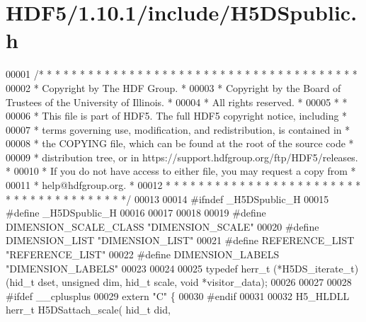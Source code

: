 \hypertarget{_h_d_f5_21_810_81_2include_2_h5_d_spublic_8h_source}{}\section{H\+D\+F5/1.10.1/include/\+H5\+D\+Spublic.h}
\label{_h_d_f5_21_810_81_2include_2_h5_d_spublic_8h_source}

\begin{DoxyCode}
00001 \textcolor{comment}{/* * * * * * * * * * * * * * * * * * * * * * * * * * * * * * * * * * * * * * *}
00002 \textcolor{comment}{ * Copyright by The HDF Group.                                               *}
00003 \textcolor{comment}{ * Copyright by the Board of Trustees of the University of Illinois.         *}
00004 \textcolor{comment}{ * All rights reserved.                                                      *}
00005 \textcolor{comment}{ *                                                                           *}
00006 \textcolor{comment}{ * This file is part of HDF5.  The full HDF5 copyright notice, including     *}
00007 \textcolor{comment}{ * terms governing use, modification, and redistribution, is contained in    *}
00008 \textcolor{comment}{ * the COPYING file, which can be found at the root of the source code       *}
00009 \textcolor{comment}{ * distribution tree, or in https://support.hdfgroup.org/ftp/HDF5/releases.  *}
00010 \textcolor{comment}{ * If you do not have access to either file, you may request a copy from     *}
00011 \textcolor{comment}{ * help@hdfgroup.org.                                                        *}
00012 \textcolor{comment}{ * * * * * * * * * * * * * * * * * * * * * * * * * * * * * * * * * * * * * * */}
00013 
00014 \textcolor{preprocessor}{#ifndef \_H5DSpublic\_H}
00015 \textcolor{preprocessor}{#define \_H5DSpublic\_H}
00016 
00017 
00018 
00019 \textcolor{preprocessor}{#define DIMENSION\_SCALE\_CLASS "DIMENSION\_SCALE"}
00020 \textcolor{preprocessor}{#define DIMENSION\_LIST        "DIMENSION\_LIST"}
00021 \textcolor{preprocessor}{#define REFERENCE\_LIST        "REFERENCE\_LIST"}
00022 \textcolor{preprocessor}{#define DIMENSION\_LABELS      "DIMENSION\_LABELS"}
00023 
00024 
00025 \textcolor{keyword}{typedef} herr\_t  (*H5DS\_iterate\_t)(hid\_t dset, \textcolor{keywordtype}{unsigned} dim, hid\_t scale, \textcolor{keywordtype}{void} *visitor\_data);
00026 
00027 
00028 \textcolor{preprocessor}{#ifdef \_\_cplusplus}
00029 \textcolor{keyword}{extern} \textcolor{stringliteral}{"C"} \{
00030 \textcolor{preprocessor}{#endif}
00031 
00032 H5\_HLDLL herr\_t  H5DSattach\_scale( hid\_t did,

\end{DoxyCode}
